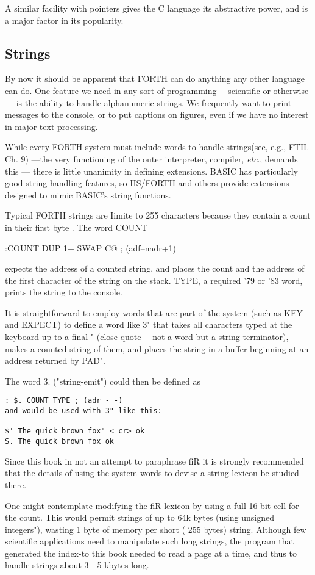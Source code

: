 A similar facility with pointers gives the C language its abstractive power, and is a major factor in its popularity.

\subsection{Strings}
By now it should be apparent that FORTH can do anything any other language can do. One feature we need in any sort of programming —scientific or otherwise — is the ability to handle alphanumeric strings. We frequently want to print messages to the console, or to put captions on figures, even if we have no interest in major text processing.

While every FORTH system must include words to handle strings(see, e.g., FTIL Ch. 9) —the very functioning of the outer interpreter, compiler, \textit{etc}., demands this — there is little unanimity in defining extensions. BASIC has particularly good string-handling features, so HS/FORTH and others provide extensions designed to mimic BASIC’s string functions.

Typical FORTH strings are Iimite to 255 characters because they
contain a count in their first byte . The word COUNT

:COUNT DUP 1+ SWAP C@ ; (adf--nadr+1)

expects the address of a counted string, and places the count and
the address of the first character of the string on the stack. TYPE,
a required ’79 or ’83 word, prints the string to the console.

It is straightforward to employ words that are part of the system
(such as KEY and EXPECT) to define a word like 3" that takes
all characters typed at the keyboard up to a final " (close-quote
—not a word but a string-terminator), makes a counted string of
them, and places the string in a buffer beginning at an address
returned by PAD".

The word 3. ("string-emit") could then be defined as
\begin{lstlisting}
: $. COUNT TYPE ; (adr - -)
and would be used with 3" like this:

$' The quick brown fox" < cr> ok
S. The quick brown fox ok
\end{lstlisting}

Since this book in not an attempt to paraphrase fiR it is strongly
recommended that the details of using the system words to devise
a string lexicon be studied there.

One might contemplate modifying the fiR lexicon by using a
full 16-bit cell for the count. This would permit strings of up to
64k bytes (using unsigned integers"), wasting 1 byte of memory
per short ( 255 bytes) string. Although few scientific applications
need to manipulate such long strings, the program that generated
the index-to this book needed to read a page at a time, and thus
to handle strings about 3—5 kbytes long.

